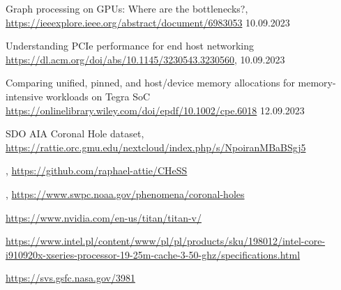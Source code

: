 \documentclass[licencjacka,en]{pracamgr}
\begin{document}
\begin{thebibliography}{99}
         Graph processing on GPUs: Where are the bottlenecks?,
        \url{https://ieeexplore.ieee.org/abstract/document/6983053} 10.09.2023

          Understanding PCIe performance for end host networking
        \url{https://dl.acm.org/doi/abs/10.1145/3230543.3230560}, 10.09.2023

         Comparing unified, pinned, and host/device memory allocations for memory-intensive workloads on Tegra SoC \url{https://onlinelibrary.wiley.com/doi/epdf/10.1002/cpe.6018} 12.09.2023

         {SDO AIA Coronal Hole dataset},
        \url{https://rattie.orc.gmu.edu/nextcloud/index.php/s/NpoiranMBaBSgj5}

        ,
        \url{https://github.com/raphael-attie/CHeSS}

        ,
        \url{https://www.swpc.noaa.gov/phenomena/coronal-holes}
        
        \url{https://www.nvidia.com/en-us/titan/titan-v/}

        \url{https://www.intel.pl/content/www/pl/pl/products/sku/198012/intel-core-i910920x-xseries-processor-19-25m-cache-3-50-ghz/specifications.html}

        \url{https://svs.gsfc.nasa.gov/3981}
        
        

        
        
\end{thebibliography}
\end{document}
